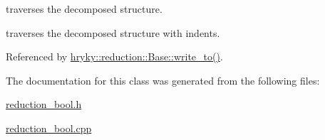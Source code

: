 traverses the decomposed structure. 

traverses the decomposed structure with indents. 

Referenced by \hyperlink{classhryky_1_1reduction_1_1_base_a709cc7c48e1c90fe253739e46d82aa19}{hryky\-::reduction\-::\-Base\-::write\-\_\-to()}.



The documentation for this class was generated from the following files\-:\begin{DoxyCompactItemize}
\item 
\hyperlink{reduction__bool_8h}{reduction\-\_\-bool.\-h}\item 
\hyperlink{reduction__bool_8cpp}{reduction\-\_\-bool.\-cpp}\end{DoxyCompactItemize}
